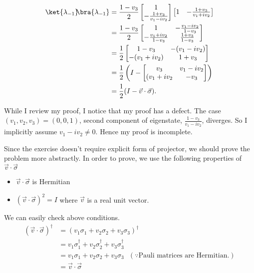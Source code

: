 \documentclass[10pt]{book}
\newcommand{\kb}[1]{\ket{#1}\hspace{-1mm} \bra{#1}} %
\begin{document}
	
	\begin{equation}
\begin{aligned}
		\kb{\lambda_{-1}} &= \frac{1 - v_3}{2} \begin{bmatrix}
			1 \\
			- \frac{1+v_3}{v_1 - iv_2}
		\end{bmatrix}
		\begin{bmatrix}
			1 & - \frac{1+v_3}{v_1 + iv_2}
		\end{bmatrix}\\
		&=
		\frac{1 - v_3}{2} \begin{bmatrix}
			1 & - \frac{v_1 - iv_2}{1 - v_3} \\
			- \frac{v_1 + iv_2}{1 - v_3} & \frac{1+v_3}{1 - v_3}
		\end{bmatrix} \\
		&=
		\frac{1}{2} \begin{bmatrix}
			1 - v_3 & -(v_1 - iv_2) \\
			- (v_1 + iv_2) & 1 + v_3
		\end{bmatrix} \\
		&=
		\frac{1}{2} \left( I - \begin{bmatrix}
			v_3 & v_1 - iv_2 \\
			(v_1 + iv_2 & - v_3
		\end{bmatrix} \right)\\
		&= \frac{1}{2} (I - \vec{v} \cdot \vec{\sigma} ).
	\end{aligned}
\end{equation}
	
	
	While I review my proof, I notice that my proof has a defect.
	The case $(v_1,v_2,v_3) = (0,0,1)$, second component of eigenstate, $\frac{1-v_3}{v_1 - iv_2}$, diverges.
	So I implicitly assume $v_1 - iv_2 \neq 0$. Hence my proof is incomplete.
	
	Since the exercise doesn't require explicit form of projector, we should prove the problem more abstractly.
	In order to prove, we use the following properties of $\vec{v} \cdot \vec{\sigma}$
	\begin{itemize}
		\item $\vec{v} \cdot \vec{\sigma}$ is Hermitian
		\item $(\vec{v} \cdot \vec{\sigma})^2 = I$ where $\vec{v}$ is a real unit vector.
	\end{itemize}
	
	We can easily check above conditions.
	\begin{equation}
\begin{aligned}
		(\vec{v} \cdot \vec{\sigma})^\dagger &= (v_1 \sigma_1 + v_2 \sigma_2 + v_3 \sigma_3)^\dagger\\
		&= v_1 \sigma_1^\dagger + v_2 \sigma_2^\dagger + v_3 \sigma_3^\dagger\\
		&= v_1 \sigma_1 + v_2 \sigma_2 + v_3 \sigma_3~~~(\because \text{Pauli matrices are Hermitian.})\\
		&= \vec{v} \cdot \vec{\sigma}
	\end{aligned}
\end{equation}
	
\end{document}
